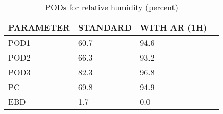 \begin{table}[]
\begin{center}
\begin{tabular}{|l|l|l|l|}
\hline
\multicolumn{1}{|c|}{\cellcolor[HTML]{C0C0C0}\textbf{PARAMETER}} & \multicolumn{1}{c|}{\cellcolor[HTML]{C0C0C0}\textbf{STANDARD}} & \multicolumn{1}{c|}{\cellcolor[HTML]{C0C0C0}\textbf{WITH AR (1H)}} \\
\hline
\cellcolor[HTML]{C0C0C0}POD1  & 60.7                                & 94.6         \\
\cellcolor[HTML]{C0C0C0}POD2  & 66.3                                & 93.2         \\
\cellcolor[HTML]{C0C0C0}POD3  & 82.3                                & 96.8         \\
\cellcolor[HTML]{C0C0C0}PC    & 69.8                                  & 94.9           \\
\cellcolor[HTML]{C0C0C0}EBD   & 1.7                                 & 0.0          \\
\hline
\end{tabular}
\caption{PODs for relative humidity (percent)}
\end{center}
\end{table}
